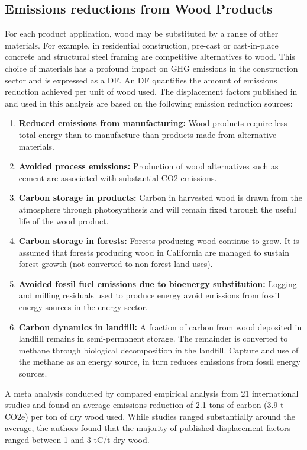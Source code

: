 \documentclass[a4paper,titlepage]{article}
\begin{document}
\subsection{Emissions reductions from Wood Products}
\label{sec:orgheadline20}

For each product application, wood may be substituted by a range of other materials. For example, in
residential construction, pre-cast or cast-in-place concrete and structural steel framing
are competitive alternatives to wood. This choice of materials has a profound impact on \ac{GHG} emissions in the
construction sector and is expressed as a \ac{DF}. An \ac{DF}  quantifies the amount of emissions reduction achieved per unit of wood used. The displacement factors published in \citep{Sathre2010} and used in this analysis are based on the
following emission reduction sources:

\begin{enumerate}
\item \textbf{Reduced emissions from manufacturing:} Wood products require less total
energy than to manufacture than products made from alternative materials.
\item \textbf{Avoided process emissions:} Production of wood alternatives such as cement are associated with 
substantial CO2 emissions.
\item \textbf{Carbon storage in products:} Carbon in harvested wood is drawn from
the atmosphere through photosynthesis and will remain fixed through
the useful life of the wood product.
\item \textbf{Carbon storage in forests:} Forests producing wood continue to grow.
It is assumed that forests producing wood in California are managed
to sustain forest growth (not converted to non-forest land uses).
\item \textbf{Avoided fossil fuel emissions due to bioenergy substitution:}
Logging and milling residuals used to produce energy avoid emissions
from fossil energy sources in the energy sector.
\item \textbf{Carbon dynamics in landfill:} A fraction of carbon from wood
deposited in landfill remains in semi-permanent storage.
The remainder is converted to methane through biological
decomposition in the landfill. Capture and use of the methane as an
energy source, in turn reduces emissions from fossil energy sources.
\end{enumerate}

A meta analysis conducted by \citep{Sathre2010} compared empirical analysis from 21 international studies and found an
average emissions reduction of 2.1 tons of carbon (3.9 t CO2e) per ton
of dry wood used. While studies ranged substantially around the average, the
authors found that the majority of published displacement factors ranged
between 1 and 3 tC/t dry wood. 
\end{document}
